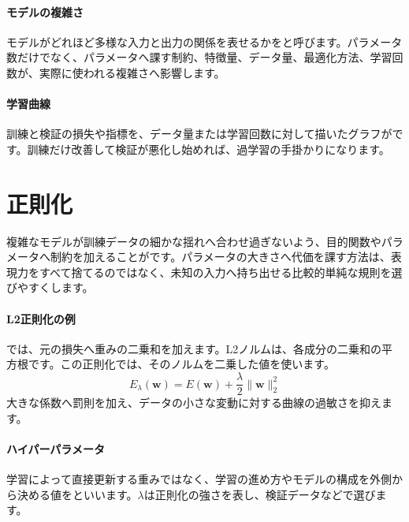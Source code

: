 \paragraph{モデルの複雑さ}
        モデルがどれほど多様な入力と出力の関係を表せるかをと呼びます。パラメータ数だけでなく、パラメータへ課す制約、特徴量、データ量、最適化方法、学習回数が、実際に使われる複雑さへ影響します。

\par
\endgroup
\medskip
\begingroup
\paragraph{学習曲線}
        訓練と検証の損失や指標を、データ量または学習回数に対して描いたグラフがです。訓練だけ改善して検証が悪化し始めれば、過学習の手掛かりになります。

\par
\endgroup
\par
\endgroup


\section{正則化}
\label{sec:06-machine-learning-11}

複雑なモデルが訓練データの細かな揺れへ合わせ過ぎないよう、目的関数やパラメータへ制約を加えることがです。パラメータの大きさへ代価を課す方法は、表現力をすべて捨てるのではなく、未知の入力へ持ち出せる比較的単純な規則を選びやすくします。

\begingroup
\begingroup
\paragraph{L2正則化の例}
        では、元の損失へ重みの二乗和を加えます。L2ノルムは、各成分の二乗和の平方根です。この正則化では、そのノルムを二乗した値を使います。
        \[
          E_{\lambda}(\mathbf{w})=
          E(\mathbf{w})+\frac{\lambda}{2}\lVert\mathbf{w}\rVert_2^2
        \]
        大きな係数へ罰則を加え、データの小さな変動に対する曲線の過敏さを抑えます。

\paragraph{ハイパーパラメータ}
        学習によって直接更新する重みではなく、学習の進め方やモデルの構成を外側から決める値をといいます。$\lambda$は正則化の強さを表し、検証データなどで選びます。

